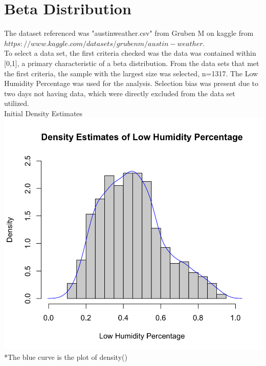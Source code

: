 \documentclass[12pt, letterpaper]{article}
\begin{document}
\section*{Beta Distribution}
\normalsize
The dataset referenced was "austinweather.csv" from Gruben M on kaggle from $https://www.kaggle.com/datasets/grubenm/austin-weather$.\\ To select a data set, the first criteria checked was the data was contained within [0,1], a primary characteristic of a beta distribution. From the data sets that met the first criteria, the sample with the largest size was selected, n=1317. The Low Humidity Percentage was used for the analysis. Selection bias was present due to two days not having data, which were directly excluded from the data set utilized.\\
Initial Density Estimates\\
\includegraphics[scale=0.41]{austinweather_densityestimates.png}
\footnotesize
\\ \**The blue curve is the plot of density() \\
\end{document}
